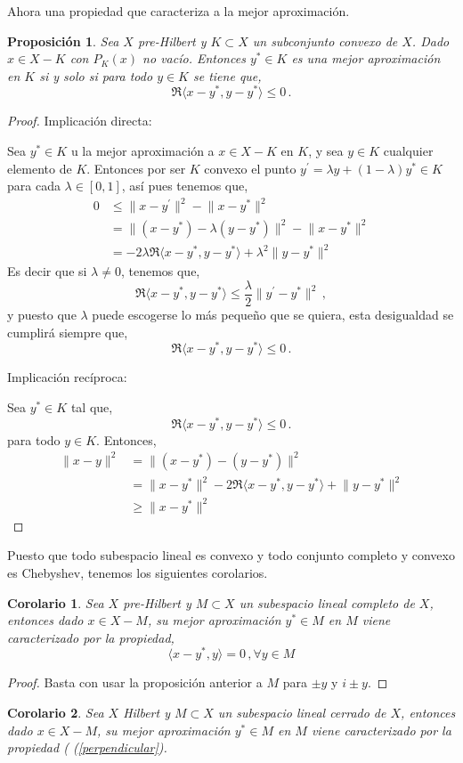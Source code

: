 \documentclass[12pt]{book}
\newtheorem{prop}{\bf Proposición}[chapter]
\newtheorem{coro}{Corolario}[chapter]
\newcommand{\norm}[1]{\lVert #1\rVert }
\newcommand{\lin}[1]{\langle #1 \rangle}
\begin{document}
Ahora una propiedad que caracteriza  a la mejor aproximación.
\begin{prop} Sea $X$ pre-Hilbert y $K\subset X$ un  subconjunto  convexo de $X$. Dado $x\in X-K$  con $P_K(x)$ no vacío. Entonces  $y^*\in K$ es una  mejor aproximación en $K$ si y solo si para todo $y\in K$  se tiene que,
\begin{equation}
\Re \lin{x-y^* , y-y^*} \leq 0\,.\label{mejor}
\end{equation}
\end{prop}
\begin{proof}
 Implicación directa:

Sea $y^*\in K$ u la mejor aproximación a $x\in X-K$ en $K$, y sea $y\in K$ cualquier elemento de $K$. Entonces por ser $K$ convexo el punto $y^\prime=\lambda y +(1-\lambda)y^*\in K$ para cada $\lambda\in [0,1]$, así pues tenemos que,
\begin{align*}
0&\leq  \norm{x-y^\prime}^2 -\norm{x-y^*}^2\\
 &=\norm{(x-y^*) - \lambda (y-y^*)}^2
-\norm{x-y^*}^2\\
&=-2\lambda\Re \lin{x-y^*,y-y^*}+\lambda^2\norm{y-y^*}^2
\end{align*}
Es decir que si $\lambda\not=0$, tenemos que,
$$\Re \lin{x-y^*,y-y^*}\leq\frac{\lambda}{2}\norm{y^\prime-y^*}^2\,,$$
y puesto que  $\lambda$ puede escogerse lo más pequeño que se quiera, esta desigualdad se cumplirá siempre que,
$$\Re \lin{x-y^*,y-y^*}\leq 0\,.$$


Implicación recíproca:

Sea $y^*\in K$ tal que,
$$\Re\lin{x-y^*,y-y^*}\leq0\,.$$
para todo $y\in K$. Entonces,
\begin{align*}
\norm{x-y}^2&=\norm{(x-y^*)-(y-y^*)}^2\\
&=\norm{x-y^*}^2-2\Re\lin{x-y^*,y-y^*} +\norm{y-y^*}^2\\
&\geq\norm{x-y^*}^2
\end{align*}



\end{proof}
Puesto  que todo  subespacio lineal es convexo y todo conjunto completo y convexo es Chebyshev, tenemos los siguientes corolarios.
\begin{coro} Sea $X$ pre-Hilbert y $M\subset X$ un subespacio lineal completo de $X$, entonces dado $x\in X-M$, su mejor aproximación $y^*\in M$ en $M$ viene caracterizado por la propiedad,
\begin{equation}
\lin{ x-y^*, y}=0\,,\forall y\in M\label{perpendicular}
\end{equation}
\end{coro}
 \begin{proof}
 Basta con usar la proposición anterior a $M$  para $\pm y$ y $i\pm y$.
 \end{proof}
\begin{coro} Sea $X$ Hilbert y $M\subset X$ un subespacio lineal cerrado de $X$, entonces dado $x\in X-M$, su mejor aproximación $y^*\in M$ en $M$ viene caracterizado por la propiedad ( (\ref{perpendicular}).
\end{coro}
 
\end{document}
